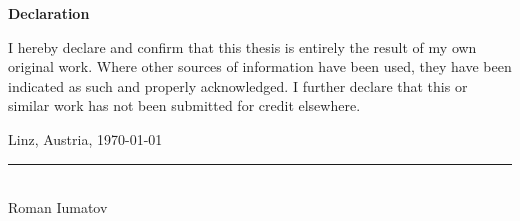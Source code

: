 
\clearpage %
\thispagestyle{plain} %

\vspace*{4cm} %

{\centering %
	\fontsize{18pt}{22pt}\selectfont %
	\bfseries %
	Declaration\par
}

\vspace{3em} %

\noindent %
I hereby declare and confirm that this thesis is entirely the result of my own original work. Where other sources of information have been used, they have been indicated as such and properly acknowledged. I further declare that this or similar work has not been submitted for credit elsewhere.

\vspace{6em} %

\noindent %
\begin{minipage}[t]{0.45\textwidth} %
	\vspace{0pt} %
	Linz, Austria,
	\today
\end{minipage}%
\hfill %
\begin{minipage}[t]{0.45\textwidth} %
	\raggedleft %
	\rule{6cm}{0.4pt} \\ %
	\vspace{0.5em} %
	Roman Iumatov
\end{minipage}

